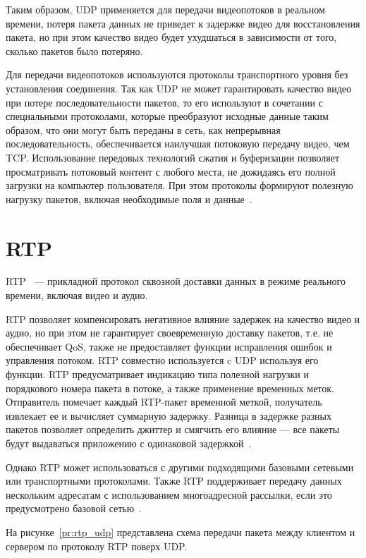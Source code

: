 Таким образом, UDP применяется для передачи видеопотоков в реальном времени, потеря пакета данных не приведет к задержке видео для восстановления пакета, но при этом качество видео будет ухудшаться в зависимости от того, сколько пакетов было потеряно.

Для передачи видеопотоков используются протоколы транспортного уровня без установления соединения. 
Так как UDP не может гарантировать качество видео при потере последовательности пакетов, то его используют в сочетании с специальными протоколами, которые преобразуют исходные данные таким образом, что они могут быть переданы в сеть, как непрерывная последовательность, обеспечивается наилучшая потоковую передачу видео, чем TCP. Использование передовых технологий сжатия и буферизации  позволяет просматривать потоковый контент с любого места, не дожидаясь его полной загрузки на компьютер пользователя. 
При этом протоколы формируют полезную нагрузку пакетов, включая необходимые поля и данные~\cite{basic_stream_protocls}. 

\section{RTP}

RTP~\cite{rtp_rtcp_overview} --- прикладной протокол сквозной доставки данных в режиме реального времени, включая видео и аудио.
 
RTP  позволяет компенсировать негативное влияние задержек на качество видео и аудио, но при этом не гарантирует своевременную доставку пакетов, т.е. не обеспечивает QoS, также не предоставляет функции исправления ошибок и управления потоком.
RTP совместно используется c UDP используя его функции. 
RTP предусматривает индикацию типа полезной нагрузки
и порядкового номера пакета в потоке, а также применение временных
меток. Отправитель помечает каждый RTP-пакет временной меткой,
получатель извлекает ее и вычисляет суммарную задержку. Разница в
задержке разных пакетов позволяет определить джиттер и смягчить его
влияние --- все пакеты будут выдаваться приложению с одинаковой
задержкой~\cite{rtp_rtcp_overview, rtp_rtcp_ip_telefone, rtp_rtcp_rtsp_mc}.

Однако RTP может использоваться с другими подходящими базовыми сетевыми или транспортными протоколами. 
Также RTP поддерживает передачу данных нескольким адресатам с использованием многоадресной рассылки, если это предусмотрено базовой сетью~\cite{rtp_rtcp_overview}.

На рисунке~\ref{pr:rtp_udp} представлена схема передачи пакета между клиентом и сервером по протоколу RTP поверх UDP.

